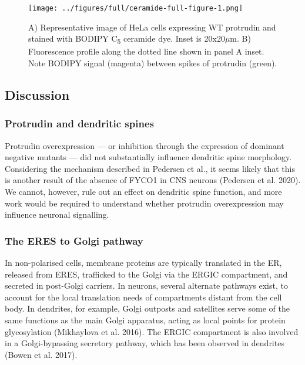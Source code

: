 \documentclass[
]{article}
\begin{document}
\begin{figure}
\centering
\texttt{[image: ../figures/full/ceramide-full-figure-1.png]}
\caption{A) Representative image of HeLa cells expressing WT protrudin
and stained with BODIPY C\textsubscript{5} ceramide dye. Inset is
20x20\(\mu\)m. B) Fluorescence profile along the dotted line shown in
panel A inset. Note BODIPY signal (magenta) between spikes of protrudin
(green).}
\end{figure}

\hypertarget{discussion}{%
\subsection{Discussion}\label{discussion}}

\hypertarget{protrudin-and-dendritic-spines}{%
\subsubsection{Protrudin and dendritic
spines}\label{protrudin-and-dendritic-spines}}

Protrudin overexpression --- or inhibition through the expression of
dominant negative mutants --- did not substantially influence dendritic
spine morphology. Considering the mechanism described in Pedersen et
al., it seems likely that this is another result of the absence of FYCO1
in CNS neurons (Pedersen et al. 2020). We cannot, however, rule out an
effect on dendritic spine function, and more work would be required to
understand whether protrudin overexpression may influence neuronal
signalling.

\hypertarget{the-eres-to-golgi-pathway}{%
\subsubsection{The ERES to Golgi
pathway}\label{the-eres-to-golgi-pathway}}

In non-polarised cells, membrane proteins are typically translated in
the ER, released from ERES, trafficked to the Golgi via the ERGIC
compartment, and secreted in post-Golgi carriers. In neurons, several
alternate pathways exist, to account for the local translation needs of
compartments distant from the cell body. In dendrites, for example,
Golgi outposts and satellites serve some of the same functions as the
main Golgi apparatus, acting as local points for protein glycosylation
(Mikhaylova et al. 2016). The ERGIC compartment is also involved in a
Golgi-bypassing secretory pathway, which has been observed in dendrites
(Bowen et al. 2017).
\end{document}
